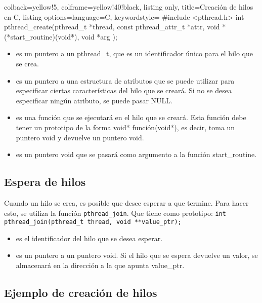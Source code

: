 \documentclass[openany]{book}
\begin{document}
\begin{tcblisting}{colback=yellow!5, colframe=yellow!40!black, listing only, title=Creación de hilos en C, listing options={language=C, keywordstyle=\color{blue!35!white}\bfseries}}
#include <pthread.h>
int pthread_create(pthread_t            *thread,
                   const pthread_attr_t *attr,
                   void                 *(*start_routine)(void*),
                   void                 *arg
                  );
\end{tcblisting}

\begin{itemize}
    \item {} es un puntero a un pthread\_t, que es un identificador único para el hilo que se crea.
    \item {} es un puntero a una estructura de atributos que se puede utilizar para especificar ciertas características del hilo que se creará. Si no se desea especificar ningún atributo, se puede pasar NULL.
    \item {} es una función que se ejecutará en el hilo que se creará. Esta función debe tener un prototipo de la forma void* función(void*), es decir, toma un puntero void y devuelve un puntero void.
    \item {} es un puntero void que se pasará como argumento a la función start\_routine.
\end{itemize}

\subsection{Espera de hilos}
Cuando un hilo se crea, es posible que desee esperar a que termine. Para hacer esto, se utiliza la función \texttt{pthread\_join}. Que tiene como prototipo: \texttt{int pthread\_join(pthread\_t thread, void **value\_ptr);}
\begin{itemize}
    \item {} es el identificador del hilo que se desea esperar.
    \item {} es un puntero a un puntero void. Si el hilo que se espera devuelve un valor, se almacenará en la dirección a la que apunta value\_ptr.
\end{itemize}

\newpage
\subsection{Ejemplo de creación de hilos}
\end{document}
